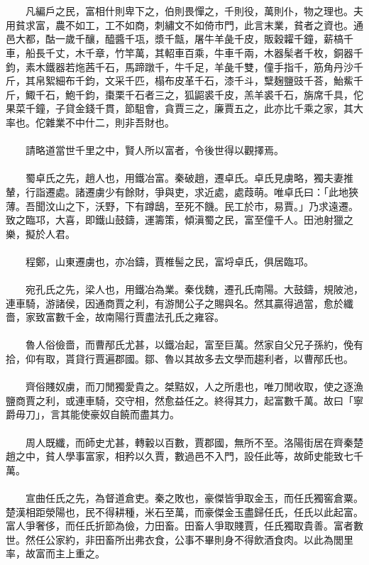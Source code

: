 \\\\
　　凡編戶之民，富相什則卑下之，伯則畏憚之，千則役，萬則仆，物之理也。夫用貧求富，農不如工，工不如商，刺繡文不如倚市門，此言末業，貧者之資也。通邑大都，酤一歲千釀，醯醬千瓨，漿千甔，屠牛羊彘千皮，販穀糶千鐘，薪槁千車，船長千丈，木千章，竹竿萬，其軺車百乘，牛車千兩，木器髤者千枚，銅器千鈞，素木鐵器若炧茜千石，馬蹄蹾千，牛千足，羊彘千雙，僮手指千，筋角丹沙千斤，其帛絮細布千鈞，文采千匹，榻布皮革千石，漆千斗，糱麹鹽豉千荅，鮐鮆千斤，鯫千石，鮑千鈞，棗栗千石者三之，狐鼦裘千皮，羔羊裘千石，旃席千具，佗果菜千鐘，子貸金錢千貫，節駔會，貪賈三之，廉賈五之，此亦比千乘之家，其大率也。佗雜業不中什二，則非吾財也。
\\\\
　　請略道當世千里之中，賢人所以富者，令後世得以觀擇焉。
\\\\
　　蜀卓氏之先，趙人也，用鐵冶富。秦破趙，遷卓氏。卓氏見虜略，獨夫妻推輦，行詣遷處。諸遷虜少有餘財，爭與吏，求近處，處葭萌。唯卓氏曰：「此地狹薄。吾聞汶山之下，沃野，下有蹲鴟，至死不饑。民工於市，易賈。」乃求遠遷。致之臨邛，大喜，即鐵山鼓鑄，運籌策，傾滇蜀之民，富至僮千人。田池射獵之樂，擬於人君。
\\\\
　　程鄭，山東遷虜也，亦冶鑄，賈椎髻之民，富埒卓氏，俱居臨邛。
\\\\
　　宛孔氏之先，梁人也，用鐵冶為業。秦伐魏，遷孔氏南陽。大鼓鑄，規陂池，連車騎，游諸侯，因通商賈之利，有游閒公子之賜與名。然其贏得過當，愈於纖嗇，家致富數千金，故南陽行賈盡法孔氏之雍容。
\\\\
　　魯人俗儉嗇，而曹邴氏尤甚，以鐵冶起，富至巨萬。然家自父兄子孫約，俛有拾，仰有取，貰貸行賈遍郡國。鄒、魯以其故多去文學而趨利者，以曹邴氏也。
\\\\
　　齊俗賤奴虜，而刀閒獨愛貴之。桀黠奴，人之所患也，唯刀閒收取，使之逐漁鹽商賈之利，或連車騎，交守相，然愈益任之。終得其力，起富數千萬。故曰「寧爵毋刀」，言其能使豪奴自饒而盡其力。
\\\\
　　周人既纖，而師史尤甚，轉轂以百數，賈郡國，無所不至。洛陽街居在齊秦楚趙之中，貧人學事富家，相矜以久賈，數過邑不入門，設任此等，故師史能致七千萬。
\\\\
　　宣曲任氏之先，為督道倉吏。秦之敗也，豪傑皆爭取金玉，而任氏獨窖倉粟。楚漢相距滎陽也，民不得耕種，米石至萬，而豪傑金玉盡歸任氏，任氏以此起富。富人爭奢侈，而任氏折節為儉，力田畜。田畜人爭取賤賈，任氏獨取貴善。富者數世。然任公家約，非田畜所出弗衣食，公事不畢則身不得飲酒食肉。以此為閭里率，故富而主上重之。
